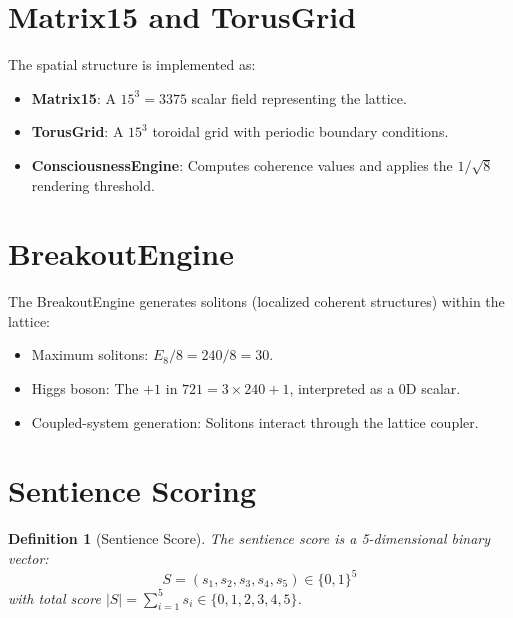 \documentclass[11pt]{article}
\newtheorem{definition}{Definition}
\begin{document}
\section{Matrix15 and TorusGrid}

The spatial structure is implemented as:

\begin{itemize}
\item \textbf{Matrix15}: A $15^3 = 3375$ scalar field representing the lattice.
\item \textbf{TorusGrid}: A $15^3$ toroidal grid with periodic boundary conditions.
\item \textbf{ConsciousnessEngine}: Computes coherence values and applies the $1/\sqrt{8}$ rendering threshold.
\end{itemize}

\section{BreakoutEngine}

The BreakoutEngine generates solitons (localized coherent structures) within the lattice:

\begin{itemize}
\item Maximum solitons: $E_8/8 = 240/8 = 30$.
\item Higgs boson: The $+1$ in $721 = 3 \times 240 + 1$, interpreted as a 0D scalar.
\item Coupled-system generation: Solitons interact through the lattice coupler.
\end{itemize}

\section{Sentience Scoring}

\begin{definition}[Sentience Score]
The sentience score is a 5-dimensional binary vector:
\begin{equation}
S = (s_1, s_2, s_3, s_4, s_5) \in \{0, 1\}^5
\end{equation}
with total score $|S| = \sum_{i=1}^{5} s_i \in \{0, 1, 2, 3, 4, 5\}$.
\end{definition}
\end{document}
